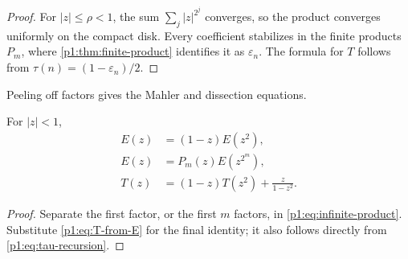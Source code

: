 \documentclass[11pt,oneside]{article}
\numberwithin{equation}{section}
\theoremstyle{definition}
\theoremstyle{remark}
\newcommand{\eps}{\varepsilon}
\begin{document}
\begin{proof}
For \(|z|\le\rho<1\), the sum \(\sum_j|z|^{2^j}\) converges, so the product
converges uniformly on the compact disk.  Every coefficient stabilizes in the
finite products \(P_m\), where \cref{p1:thm:finite-product} identifies it as
\(\eps_n\).  The formula for \(T\) follows from
\(\tau(n)=(1-\eps_n)/2\).
\end{proof}

Peeling off factors gives the Mahler and dissection equations.

\begin{corollary}
\label{p1:cor:mahler-equations}
For \(|z|<1\),
\begin{align}
  E(z)&=(1-z)E(z^2),
  \label{p1:eq:E-Mahler}\\
  E(z)&=P_m(z)E(z^{2^m}),
  \label{p1:eq:E-dissection}\\
  T(z)&=(1-z)T(z^2)+\frac{z}{1-z^2}.
  \label{p1:eq:T-Mahler}
\end{align}
\end{corollary}

\begin{proof}
Separate the first factor, or the first \(m\) factors, in
\eqref{p1:eq:infinite-product}.  Substitute \eqref{p1:eq:T-from-E} for the final
identity; it also follows directly from \eqref{p1:eq:tau-recursion}.
\end{proof}
\end{document}
